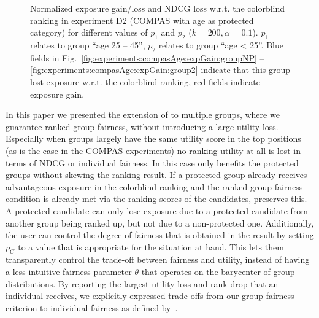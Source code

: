 \begin{figure}[t!]
	\vspace{-3mm}
	\caption{Normalized exposure gain/loss and NDCG loss w.r.t. the colorblind ranking in experiment D2 (COMPAS with age as protected category) for different values of $p_1$ and $p_2$ ($k=200, \alpha=0.1$).
		$p_1$ relates to group ``age 25 -- 45'', $p_2$ relates to group ``age < 25''.
		Blue fields in Fig.~\ref{fig:experiments:compasAge:expGain:groupNP} -- \ref{fig:experiments:compasAge:expGain:group2} indicate that this group lost exposure w.r.t. the colorblind ranking, red fields indicate exposure gain.
	}
	\label{fig:results-moving-p}
\end{figure}

In this paper we presented the extension of \algoFAIR to multiple groups, where we guarantee ranked group fairness, without introducing a large utility loss.
%
Especially when groups largely have the same utility score in the top positions (as is the case in the COMPAS experiments) no ranking utility at all is lost in terms of NDCG or individual fairness.
%
In this case \algoFAIR only benefits the protected groups without skewing the ranking result.
%
If a protected group already receives advantageous exposure in the colorblind ranking and the ranked group fairness condition is already met via the ranking scores of the candidates, \algoFAIR preserves this.
%
A protected candidate can only lose exposure due to a protected candidate from another group being ranked up, but not due to a non-protected one.
%
Additionally, the user can control the degree of fairness that is obtained in the result by setting $p_G$ to a value that is appropriate for the situation at hand.
%
This lets them transparently control the trade-off between fairness and utility, instead of having a less intuitive fairness parameter $\theta$ that operates on the barycenter of group distributions.
%
By reporting the largest utility loss and rank drop that an individual receives, we explicitly expressed trade-offs from our group fairness criterion to individual fairness as defined by~\citet{Dwork2012}. 

